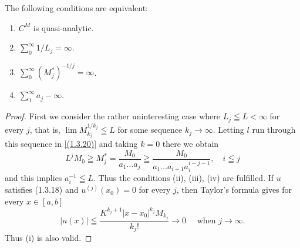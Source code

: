 \begin{theorem}
    The following conditions are equivalent:
\begin{enumerate}
    \item $C^{M}$ is quasi-analytic.
    \item $\sum_{0}^{\infty} 1 / L_{j}=\infty$.
    \item  $\sum_{0}^{\infty}\left(M_{j}^{*}\right)^{-1 / j}=\infty$.
    \item $\sum_{1}^{\infty} a_{j}-\infty$.
\end{enumerate}
\end{theorem}
\begin{proof}
    First we consider the rather uninteresting case where $L_{j} \leqq L<\infty$ for every $j$, that is, $\lim M_{k_{j}}^{1 / k_{j}} \leqq L$ for some sequence $k_{j} \rightarrow \infty$. Letting $l$ run through this sequence in \eqref{(1.3.20)} and taking $k=0$ there we obtain
\[
	L^{j} M_{0} \geqq M_{j}^{*}= \frac{M_{0}}{a_{1} \ldots a_{j}}  \geqq \frac{M_{0}}{a_{1} \ldots a_{i-1} a_{i}^{i-j-1}}, \quad i \leqq j
\]
and this implies $a_{i}^{-1} \leqq L$. Thus the conditions (ii), (iii), (iv) are fulfilled. If $u$ satisfies (1.3.18) and $u^{(j)}(x_0)=0$ for every $j$, then Taylor's formula gives for every $x \in[a, b]$
\[
	|u(x)| \leqq \frac{K^{k_{j}+1}\left|x-x_{0}\right|^{k_{j}} M_{k_{j}}}{k_{j} !} \rightarrow 0 \quad \text { when } j \rightarrow \infty.
\]
Thus (i) is also valid.


\end{proof}
